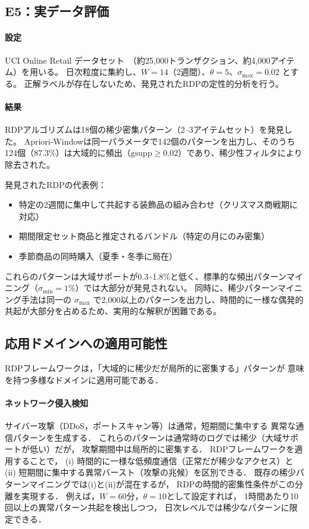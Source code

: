 \subsection{E5：実データ評価}

\paragraph{設定}
UCI Online Retail データセット~\cite{agrawal1994apriori}（約25{,}000トランザクション、約4{,}000アイテム）を用いる。
日次粒度に集約し、$W = 14$（2週間）、$\theta = 5$、$\sigma_{\max} = 0.02$ とする。
正解ラベルが存在しないため、発見されたRDPの定性的分析を行う。

\paragraph{結果}
RDPアルゴリズムは18個の稀少密集パターン（2--3アイテムセット）を発見した。
Apriori-Windowは同一パラメータで142個のパターンを出力し、そのうち124個（87.3\%）は大域的に頻出（$\text{gsupp} \geq 0.02$）であり、稀少性フィルタにより除去された。

発見されたRDPの代表例：
\begin{itemize}
\item 特定の2週間に集中して共起する装飾品の組み合わせ（クリスマス商戦期に対応）
\item 期間限定セット商品と推定されるバンドル（特定の月にのみ密集）
\item 季節商品の同時購入（夏季・冬季に局在）
\end{itemize}

これらのパターンは大域サポートが0.3--1.8\%と低く、標準的な頻出パターンマイニング（$\sigma_{\min} = 1\%$）では大部分が発見されない。
同時に、稀少パターンマイニング手法は同一の $\sigma_{\max}$ で2{,}000以上のパターンを出力し、時間的に一様な偶発的共起が大部分を占めるため、実用的な解釈が困難である。

\subsection{応用ドメインへの適用可能性}\label{sec:applicability}

RDPフレームワークは，「大域的に稀少だが局所的に密集する」パターンが
意味を持つ多様なドメインに適用可能である．

\paragraph{ネットワーク侵入検知}
サイバー攻撃（DDoS，ポートスキャン等）は通常，短期間に集中する
異常な通信パターンを生成する．
これらのパターンは通常時のログでは稀少（大域サポートが低い）だが，
攻撃期間中は局所的に密集する．
RDPフレームワークを適用することで，
(i) 時間的に一様な低頻度通信（正常だが稀少なアクセス）と
(ii) 短期間に集中する異常バースト（攻撃の兆候）を区別できる．
既存の稀少パターンマイニングでは(i)と(ii)が混在するが，
RDPの時間的密集性条件がこの分離を実現する．
例えば，$W = 60$分，$\theta = 10$として設定すれば，
1時間あたり10回以上の異常パターン共起を検出しつつ，
日次レベルでは稀少なパターンに限定できる．

